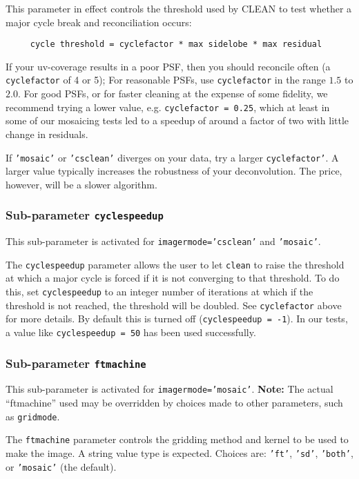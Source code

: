 This parameter in effect controls the threshold used by CLEAN to test whether
a major cycle break and reconciliation occurs:
\small
\begin{verbatim}
     cycle threshold = cyclefactor * max sidelobe * max residual
\end{verbatim}
\normalsize

If your uv-coverage results in a poor PSF, then you should reconcile often
(a {\tt cyclefactor} of 4 or 5); For reasonable PSFs, use {\tt cyclefactor} in the range
$1.5$ to $2.0$.  For good PSFs, or for faster cleaning at the expense
of some fidelity, we recommend trying a lower value, e.g. 
{\tt cyclefactor = 0.25}, which at least in some of our mosaicing
tests led to a speedup of
around a factor of two with little change in residuals.

If {\tt 'mosaic'} or {\tt 'csclean'} diverges on your data, try a
larger {\tt cyclefactor'}. A larger value typically increases the
robustness of your deconvolution. The price, however, will be a slower
algorithm.

\subsubsection{Sub-parameter {\tt cyclespeedup} }
\label{section:im.clean.imagermode.cyclespeedup}

This sub-parameter is activated for {\tt imagermode='csclean'} and
{\tt 'mosaic'}.

The {\tt cyclespeedup} parameter allows the user to let {\tt clean}
to raise the threshold at which a major cycle is forced if it is not
converging to that threshold.  To do this, set {\tt cyclespeedup} to
an integer number of iterations at which if the threshold is not reached,
the threshold will be doubled.  See {\tt cyclefactor} above for more
details.  By default this is turned off ({\tt cyclespeedup = -1}).
In our tests, a value like {\tt cyclespeedup = 50} has been used successfully.

\subsubsection{Sub-parameter {\tt ftmachine} }
\label{section:im.imagermode.mosaic.ftmachine}

This sub-parameter is activated for {\tt imagermode='mosaic'}. 
{\bf Note:} The actual ``ftmachine'' used may be overridden by choices
made to other parameters, such as {\tt gridmode}.

The {\tt ftmachine} parameter controls the gridding method and kernel to be
used to make the image.  A string value type is expected.
Choices are: {\tt 'ft'}, {\tt 'sd'}, {\tt 'both'}, or {\tt 'mosaic'} (the default).

